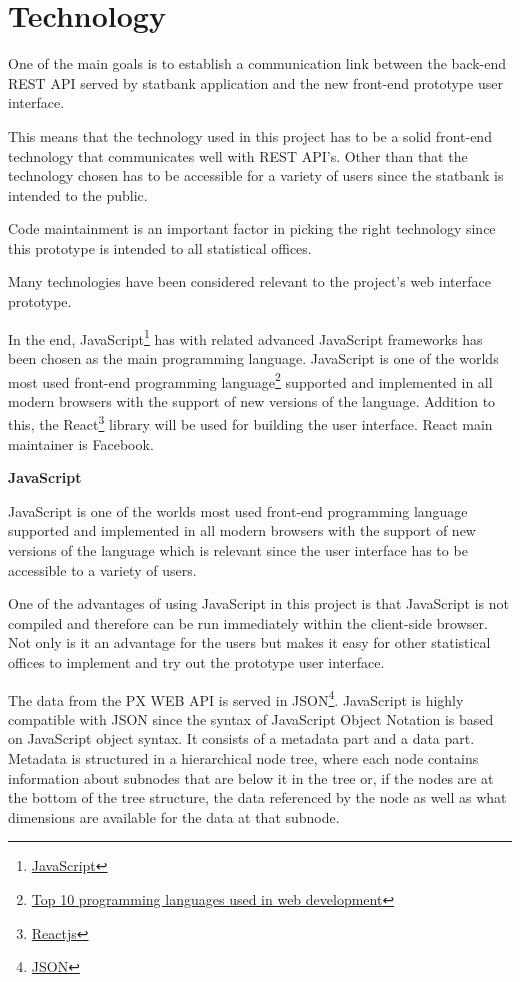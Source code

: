 \section{Technology}
One of the main goals is to establish a communication link between the back-end REST API served by statbank application and the new front-end prototype user interface. 

This means that the technology used in this project has to be a solid front-end technology that communicates well with REST API's. Other than that the technology chosen has to be accessible for a variety of users since the statbank is intended to the public. 

Code maintainment is an important factor in picking the right technology since this prototype is intended to all statistical offices.

Many technologies have been considered relevant to the project's web interface prototype.

In the end, JavaScript\footnote{\href{https://www.javascript.com/}{JavaScript}\label{javascript}} has with related advanced JavaScript frameworks has been chosen as the main programming language. JavaScript is one of the worlds most used front-end programming language\footnote{\href{http://blog.stoneriverelearning.com/top-10-programming-languages-used-in-web-development/}{Top 10 programming languages used in web development}\label{jstop10}} supported and implemented in all modern browsers with the support of new versions of the language. Addition to this, the React\footnote{\href{https://reactjs.org/}{Reactjs}\label{react}} library will be used for building the user interface. React main maintainer is Facebook.

\bigskip
\centerline{\textbf{JavaScript}}
\medskip

JavaScript is one of the worlds most used front-end programming language supported and implemented in all modern browsers with the support of new versions of the language which is relevant since the user interface has to be accessible to a variety of users.

One of the advantages of using JavaScript in this project is that JavaScript is not compiled and therefore can be run immediately within the client-side browser. Not only is it an advantage for the users but makes it easy for other statistical offices to implement and try out the prototype user interface.  

The data from the PX WEB API is served in JSON\footnote{\href{https://json.org/}{JSON}\label{json}}. JavaScript is highly compatible with JSON since the syntax of JavaScript Object Notation is based on JavaScript object syntax. It  consists of a metadata part and a data part. Metadata is structured in a hierarchical node tree, where each node contains information about subnodes that are below it in the tree or, if the nodes are at the bottom of the tree structure, the data referenced by the node as well as what dimensions are available for the data at that subnode.

